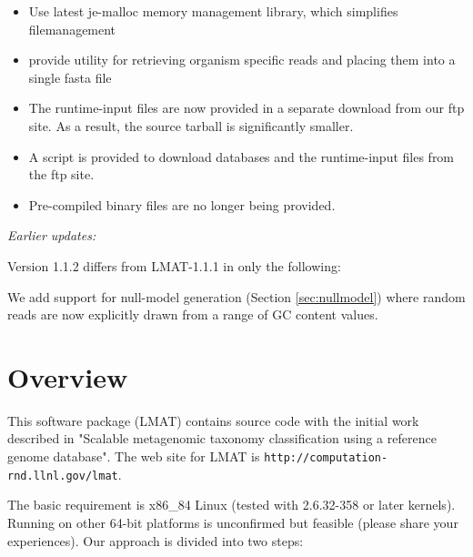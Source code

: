\documentclass[11pt]{article}
\begin{document}
\begin{itemize}
\item Use latest je-malloc memory management library, which simplifies filemanagement
\item provide utility for retrieving organism specific reads and placing them into a single fasta file
\item The runtime-input files are now provided in a separate download from our ftp site.  As a result, the source tarball is significantly smaller.
\item A script is provided to download databases and the runtime-input files from the ftp site.
\item Pre-compiled binary files are no longer being provided.
\end{itemize}

{\it Earlier updates:}

Version 1.1.2 differs from LMAT-1.1.1 in only the following:

We add support for null-model generation (Section \ref{sec:nullmodel})
where random reads are now explicitly drawn from a range of GC content
values.


\section{Overview}

This software package (LMAT) contains source code with the initial work described in
"Scalable metagenomic taxonomy classification using a reference genome 
database".   
     The web site for LMAT is \texttt{http://computation-rnd.llnl.gov/lmat}.  
     
The basic requirement is x86_84 Linux (tested with 2.6.32-358 or later kernels).  Running on other 64-bit platforms is unconfirmed but feasible (please share your experiences).
Our approach is divided into two steps:
\end{document}
